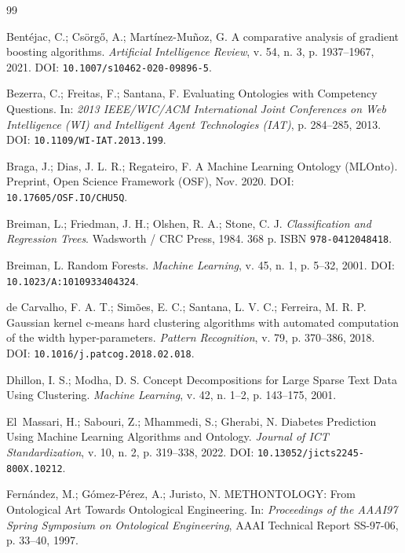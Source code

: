 \documentclass[11pt,a4paper]{article}
\begin{document}
\begin{thebibliography}{99}\small

Bentéjac, C.; Csörgő, A.; Martínez-Muñoz, G. A comparative analysis of gradient boosting algorithms. \emph{Artificial Intelligence Review}, v. 54, n. 3, p. 1937--1967, 2021. DOI: \texttt{10.1007/s10462-020-09896-5}.

Bezerra, C.; Freitas, F.; Santana, F. Evaluating Ontologies with Competency Questions. In: \emph{2013 IEEE/WIC/ACM International Joint Conferences on Web Intelligence (WI) and Intelligent Agent Technologies (IAT)}, p. 284--285, 2013. DOI: \texttt{10.1109/WI-IAT.2013.199}.

Braga, J.; Dias, J. L. R.; Regateiro, F. A Machine Learning Ontology (MLOnto). Preprint, Open Science Framework (OSF), Nov. 2020. DOI: \texttt{10.17605/OSF.IO/CHU5Q}.

Breiman, L.; Friedman, J. H.; Olshen, R. A.; Stone, C. J. \emph{Classification and Regression Trees}. Wadsworth / CRC Press, 1984. 368 p. ISBN \texttt{978-0412048418}.

Breiman, L. Random Forests. \emph{Machine Learning}, v. 45, n. 1, p. 5--32, 2001. DOI: \texttt{10.1023/A:1010933404324}.

de Carvalho, F. A. T.; Simões, E. C.; Santana, L. V. C.; Ferreira, M. R. P. Gaussian kernel c-means hard clustering algorithms with automated computation of the width hyper-parameters. \emph{Pattern Recognition}, v. 79, p. 370--386, 2018. DOI: \texttt{10.1016/j.patcog.2018.02.018}.

Dhillon, I. S.; Modha, D. S. Concept Decompositions for Large Sparse Text Data Using Clustering. \emph{Machine Learning}, v. 42, n. 1--2, p. 143--175, 2001.

El~Massari, H.; Sabouri, Z.; Mhammedi, S.; Gherabi, N. Diabetes Prediction Using Machine Learning Algorithms and Ontology. \emph{Journal of ICT Standardization}, v. 10, n. 2, p. 319--338, 2022. DOI: \texttt{10.13052/jicts2245-800X.10212}.

Fernández, M.; Gómez-Pérez, A.; Juristo, N. METHONTOLOGY: From Ontological Art Towards Ontological Engineering. In: \emph{Proceedings of the AAAI97 Spring Symposium on Ontological Engineering}, AAAI Technical Report SS-97-06, p. 33--40, 1997.


\end{thebibliography}
\end{document}
